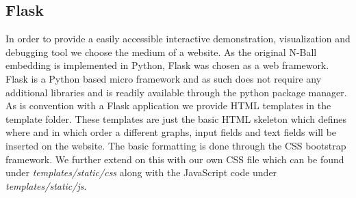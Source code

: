 \documentclass[]{article}
\begin{document}
\subsection{Flask}
\label{sec::flask}
In order to provide a easily accessible interactive demonstration, visualization and debugging tool we choose the medium of a website. As the original N-Ball embedding is implemented in Python, Flask was chosen as a web framework.  Flask is a Python based micro framework and as such does not require any additional libraries and is readily available through the python package manager. 
As is convention with a Flask application we provide HTML templates in the template folder. These templates are just the basic HTML skeleton which defines where and in which order a different graphs, input fields and text fields will be inserted on the website. The basic formatting is done through the CSS bootstrap framework. We further extend on this with our own CSS file which can be found under \textit{templates/static/css} along with the JavaScript code under \textit{templates/static/js}. 
\end{document}
